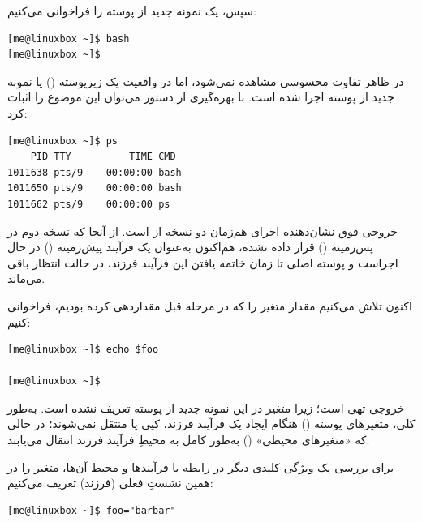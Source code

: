 سپس، یک نمونه جدید از پوسته را فراخوانی می‌کنیم:

\begin{latin}
\begin{lstlisting}
[me@linuxbox ~]$ bash
[me@linuxbox ~]$
\end{lstlisting}
\end{latin}

در ظاهر تفاوت محسوسی مشاهده نمی‌شود، اما در واقعیت یک زیرپوسته () یا نمونه جدید از پوسته اجرا شده است. با بهره‌گیری از دستور  می‌توان این موضوع را اثبات کرد:

\begin{latin}
\begin{lstlisting}
[me@linuxbox ~]$ ps
    PID TTY          TIME CMD
1011638 pts/9    00:00:00 bash
1011650 pts/9    00:00:00 bash
1011662 pts/9    00:00:00 ps
\end{lstlisting}
\end{latin}

خروجی فوق نشان‌دهنده اجرای هم‌زمان دو نسخه از  است. از آنجا که نسخه دوم در پس‌زمینه () قرار داده نشده، هم‌اکنون به‌عنوان یک فرآیند پیش‌زمینه () در حال اجراست و پوسته اصلی تا زمان خاتمه یافتن این فرآیند فرزند، در حالت انتظار باقی می‌ماند.

اکنون تلاش می‌کنیم مقدار متغیر  را که در مرحله قبل مقداردهی کرده بودیم، فراخوانی کنیم:

\begin{latin}
\begin{lstlisting}
[me@linuxbox ~]$ echo $foo

[me@linuxbox ~]$
\end{lstlisting}
\end{latin}

خروجی تهی است؛ زیرا متغیر  در این نمونه جدید از پوسته تعریف نشده است. به‌طور کلی، متغیرهای پوسته () هنگام ایجاد یک فرآیند فرزند، کپی یا منتقل نمی‌شوند؛ در حالی که «متغیرهای محیطی» () به‌طور کامل به محیطِ فرآیند فرزند انتقال می‌یابند.

برای بررسی یک ویژگی کلیدی دیگر در رابطه با فرآیندها و محیط آن‌ها، متغیر  را در همین نشستِ فعلی (فرزند) تعریف می‌کنیم:

\begin{latin}
\begin{lstlisting}
[me@linuxbox ~]$ foo="barbar"
\end{lstlisting}
\end{latin}


